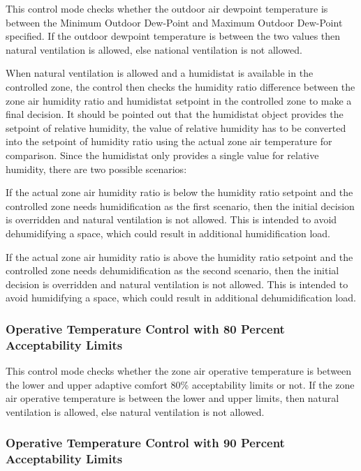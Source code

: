 This control mode checks whether the outdoor air dewpoint temperature is between the Minimum Outdoor Dew-Point and Maximum Outdoor Dew-Point specified. If the outdoor dewpoint temperature is between the two values then natural ventilation is allowed, else national ventilation is not allowed.

When natural ventilation is allowed and a humidistat is available in the controlled zone, the control then checks the humidity ratio difference between the zone air humidity ratio and humidistat setpoint in the controlled zone to make a final decision. It should be pointed out that the humidistat object provides the setpoint of relative humidity, the value of relative humidity has to be converted into the setpoint of humidity ratio using the actual zone air temperature for comparison. Since the humidistat only provides a single value for relative humidity, there are two possible scenarios:

If the actual zone air humidity ratio is below the humidity ratio setpoint and the controlled zone needs humidification as the first scenario, then the initial decision is overridden and natural ventilation is not allowed. This is intended to avoid dehumidifying a space, which could result in additional humidification load.

If the actual zone air humidity ratio is above the humidity ratio setpoint and the controlled zone needs dehumidification as the second scenario, then the initial decision is overridden and natural ventilation is not allowed. This is intended to avoid humidifying a space, which could result in additional dehumidification load.

\subsubsection{Operative Temperature Control with 80 Percent Acceptability Limits}\label{operative-temperature-control-with-80-acceptability-limits}

 This control mode checks whether the zone air operative temperature is between the lower and upper adaptive comfort 80\% acceptability limits or not. If the zone air operative temperature is between the lower and upper limits, then natural ventilation is allowed, else natural ventilation is not allowed.

\subsubsection{Operative Temperature Control with 90 Percent Acceptability Limits}\label{operative-temperature-control-with-90-acceptability-limits}


